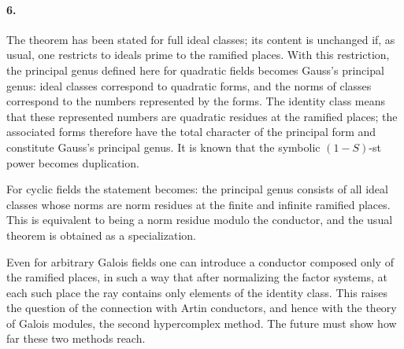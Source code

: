 \documentclass[11pt]{article}
\begin{document}
\paragraph{6.}
The theorem has been stated for full ideal classes; its content is unchanged if, as usual, one restricts to ideals prime to the ramified places. With this restriction, the principal genus defined here for quadratic fields becomes Gauss's principal genus: ideal classes correspond to quadratic forms, and the norms of classes correspond to the numbers represented by the forms. The identity class means that these represented numbers are quadratic residues at the ramified places; the associated forms therefore have the total character of the principal form and constitute Gauss's principal genus. It is known that the symbolic \((1-S)\)-st power becomes duplication.

For cyclic fields the statement becomes: the principal genus consists of all ideal classes whose norms are norm residues at the finite and infinite ramified places. This is equivalent to being a norm residue modulo the conductor, and the usual theorem is obtained as a specialization.

Even for arbitrary Galois fields one can introduce a conductor composed only of the ramified places, in such a way that after normalizing the factor systems, at each such place the ray contains only elements of the identity class. This raises the question of the connection with Artin conductors, and hence with the theory of Galois modules, the second hypercomplex method. The future must show how far these two methods reach.
\end{document}
